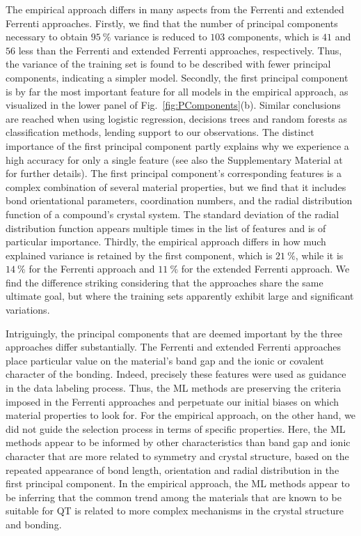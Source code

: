 \documentclass[superscriptaddress,unsortedaddress,
 amsmath,amssymb,
 aps,
]{revtex4-2}
\begin{document}
The empirical approach differs in many aspects from the Ferrenti and extended Ferrenti approaches. 
Firstly, we find that the number of principal components necessary to obtain $95 \ \%$ variance is reduced to $103$ components, which is $41$ and $56$ less than the Ferrenti and extended Ferrenti approaches, respectively. Thus, the variance of the training set is found to be described with fewer principal components, indicating a simpler model. Secondly, the first principal component is by far the most important feature for all models in the empirical approach, as visualized in the lower panel of Fig.~\ref{fig:PComponents}(b). Similar conclusions are reached when using logistic regression, decisions trees and random forests as classification methods, lending support to our observations. 
The distinct importance of the first principal component partly explains why we experience a high accuracy for only a single feature (see also the Supplementary Material at \cite{supplementary} for further details).  The first principal component's corresponding features is a complex combination of several material properties, but we find that it includes bond orientational parameters, coordination numbers, and the radial distribution function of a compound's crystal system. 
The standard deviation of the radial distribution function appears multiple times in the list of features and is of particular importance. 
Thirdly, the empirical approach differs in how much explained variance is retained by the first component, which is $21 \ \%$, while it is $14 \ \%$ for the Ferrenti approach and $11 \ \%$ for the extended Ferrenti approach. We find the difference striking considering that the approaches share the same ultimate goal, but where the training sets apparently exhibit large and significant variations. 

Intriguingly, the principal components that are deemed important by the three approaches differ substantially. The Ferrenti and extended Ferrenti approaches place particular value on the material's band gap and the ionic or covalent character of the bonding. Indeed, precisely these features were used as guidance in the data labeling process. Thus, the ML methods are preserving the criteria imposed in the Ferrenti approaches and perpetuate our initial biases on which material properties to look for. For the empirical approach, on the other hand, we did not guide the selection process in terms of specific properties. Here, the ML methods appear to be informed by other  characteristics than band gap and ionic character that are more related to symmetry and crystal structure, based on the repeated appearance of bond length, orientation and radial distribution in the first principal component. In the empirical approach, the ML methods appear to be inferring that the common trend among the materials that are known to be suitable for QT is related to more complex mechanisms in the crystal structure and bonding. 
\end{document}
